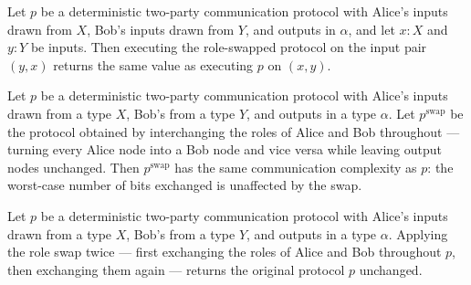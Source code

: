 \begin{theorem}
\label{CommunicationComplexity.Deterministic.Protocol.swap_run}
\leanok
{}
Let $p$ be a deterministic two-party communication protocol with Alice's inputs drawn
from $X$, Bob's inputs drawn from $Y$, and outputs in $\alpha$, and let $x : X$ and $y :
Y$ be inputs. Then executing the role-swapped protocol on the input pair $(y, x)$
returns the same value as executing $p$ on $(x, y)$.
\end{theorem}

\begin{theorem}
\label{CommunicationComplexity.Deterministic.Protocol.swap_complexity}
\leanok
{}
Let $p$ be a deterministic two-party communication protocol with Alice's inputs drawn
from a type $X$, Bob's from a type $Y$, and outputs in a type $\alpha$. Let
$p^{\mathrm{swap}}$ be the protocol obtained by interchanging the roles of Alice and Bob
throughout — turning every Alice node into a Bob node and vice versa while leaving
output nodes unchanged. Then $p^{\mathrm{swap}}$ has the same communication complexity
as $p$: the worst-case number of bits exchanged is unaffected by the swap.
\end{theorem}

\begin{theorem}
\label{CommunicationComplexity.Deterministic.Protocol.swap_swap}
\leanok
{}
Let $p$ be a deterministic two-party communication protocol with Alice's inputs drawn
from a type $X$, Bob's from a type $Y$, and outputs in a type $\alpha$. Applying the
role swap twice — first exchanging the roles of Alice and Bob throughout $p$, then
exchanging them again — returns the original protocol $p$ unchanged.
\end{theorem}

